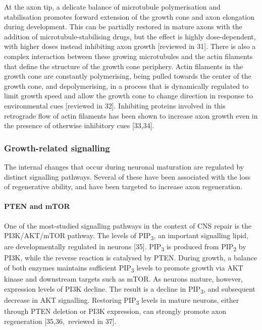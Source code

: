 \documentclass[
  12pt,
  a4paper,
]{book}
\begin{document}
At the axon tip, a delicate balance of microtubule polymerisation and stabilisation promotes forward extension of the growth cone and axon elongation during development. This can be partially restored in mature axons with the addition of microtubule-stabilising drugs, but the effect is highly dose-dependent, with higher doses instead inhibiting axon growth {[}reviewed in 31{]}. There is also a complex interaction between these growing microtubules and the actin filaments that define the structure of the growth cone periphery. Actin filaments in the growth cone are constantly polymerising, being pulled towards the center of the growth cone, and depolymerising, in a process that is dynamically regulated to limit growth speed and allow the growth cone to change direction in response to environmental cues {[}reviewed in 32{]}. Inhibiting proteins involved in this retrograde flow of actin filaments has been shown to increase axon growth even in the presence of otherwise inhibitory cues {[}33,34{]}.

\subsubsection{Growth-related signalling}\label{growth-related-signalling}

The internal changes that occur during neuronal maturation are regulated by distinct signalling pathways. Several of these have been associated with the loss of regenerative ability, and have been targeted to increase axon regeneration.

\paragraph{PTEN and mTOR}\label{pten-and-mtor}

One of the most-studied signalling pathways in the context of CNS repair is the PI3K/AKT/mTOR pathway. The levels of PIP\textsubscript{3}, an important signalling lipid, are developmentally regulated in neurons {[}35{]}. PIP\textsubscript{3} is produced from PIP\textsubscript{2} by PI3K, while the reverse reaction is catalysed by PTEN. During growth, a balance of both enzymes maintains sufficient PIP\textsubscript{3} levels to promote growth via AKT kinase and downstream targets such as mTOR. As neurons mature, however, expression levels of PI3K decline. The result is a decline in PIP\textsubscript{3}, and subsequent decrease in AKT signalling. Restoring PIP\textsubscript{3} levels in mature neurons, either through PTEN deletion or PI3K expression, can strongly promote axon regeneration {[}35,36,~reviewed in 37{]}.
\end{document}
